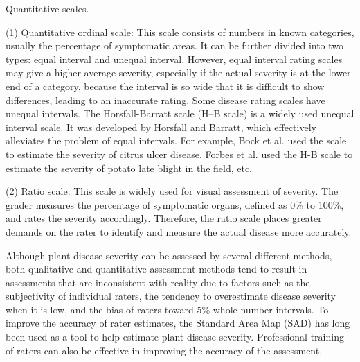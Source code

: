 Quantitative scales.

(1) Quantitative ordinal scale: This scale consists of numbers in known categories, usually the percentage of symptomatic areas. It can be further divided into two types: equal interval and unequal interval. However, equal interval rating scales may give a higher average severity, especially if the actual severity is at the lower end of a category, because the interval is so wide that it is difficult to show differences, leading to an inaccurate rating. Some disease rating scales have unequal intervals. The Horsfall-Barratt scale (H–B scale) is a widely used unequal interval scale. It was developed by Horsfall and Barratt, which effectively alleviates the problem of equal intervals. For example, Bock et al. used the scale to estimate the severity of citrus ulcer disease. Forbes et al. used the H-B scale to estimate the severity of potato late blight in the field, etc.

(2) Ratio scale: This scale is widely used for visual assessment of severity. The grader measures the percentage of symptomatic organs, defined as 0\% to 100\%, and rates the severity accordingly. Therefore, the ratio scale places greater demands on the rater to identify and measure the actual disease more accurately.

Although plant disease severity can be assessed by several different methods, both qualitative and quantitative assessment methods tend to result in assessments that are inconsistent with reality due to factors such as the subjectivity of individual raters, the tendency to overestimate disease severity when it is low, and the bias of raters toward 5\% whole number intervals. To improve the accuracy of rater estimates, the Standard Area Map (SAD) has long been used as a tool to help estimate plant disease severity. Professional training of raters can also be effective in improving the accuracy of the assessment.

